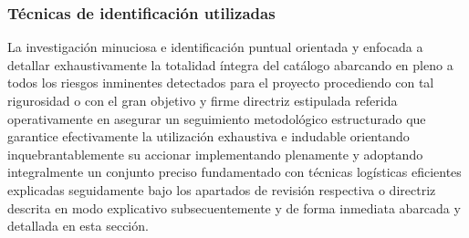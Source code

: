 \documentclass[11pt,spanish]{article}
\begin{document}
\subsubsection{Técnicas de identificación utilizadas}

La investigación minuciosa e identificación puntual orientada y enfocada a detallar exhaustivamente la totalidad íntegra del catálogo abarcando en pleno a todos los riesgos inminentes detectados para el proyecto procediendo con tal rigurosidad o con el gran objetivo y firme directriz estipulada referida operativamente en asegurar un seguimiento metodológico estructurado que garantice efectivamente la utilización exhaustiva e indudable orientando inquebrantablemente su accionar implementando plenamente y adoptando integralmente un conjunto preciso fundamentado con técnicas logísticas eficientes explicadas seguidamente bajo los apartados de revisión respectiva o directriz descrita en modo explicativo subsecuentemente y de forma inmediata abarcada y detallada en esta sección.
\end{document}
